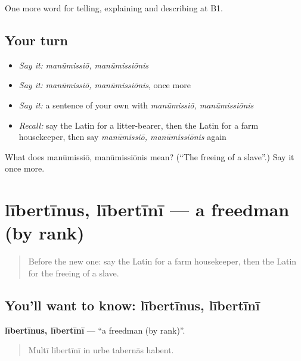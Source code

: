 \begin{grammarlens}[title={What you've built}]
One more word for telling, explaining and describing at B1.
\end{grammarlens}

\subsection*{Your turn}
\begin{itemize}
\raggedright
  \item \emph{Say it:} \emph{manūmissiō, manūmissiōnis}
  \item \emph{Say it:} \emph{manūmissiō, manūmissiōnis}, once more
  \item \emph{Say it:} a sentence of your own with \emph{manūmissiō, manūmissiōnis}
  \item \emph{Recall:} say the Latin for a litter-bearer, then the Latin for a farm housekeeper, then say \emph{manūmissiō, manūmissiōnis} again
\end{itemize}

\begin{tcolorbox}[breakable,colback=teal!4,colframe=teal!35!black,title={Before you move on}]
What does manūmissiō, manūmissiōnis mean? (\textquotedblleft{}The freeing of a slave\textquotedblright{}.) Say it once more.
\end{tcolorbox}
\section[lībertīnus, lībertīnī]{lībertīnus, lībertīnī — a freedman (by rank)}

\label{lesson:LA-C532-libertinus}



\begin{quote}
Before the new one: say the Latin for a farm housekeeper, then the Latin for the freeing of a slave.
\end{quote}

\subsection*{You'll want to know: lībertīnus, lībertīnī}
\textbf{lībertīnus, lībertīnī} — \textquotedblleft{}a freedman (by rank)\textquotedblright{}.

\begin{quote}
Multī lībertīnī in urbe tabernās habent.
\end{quote}

